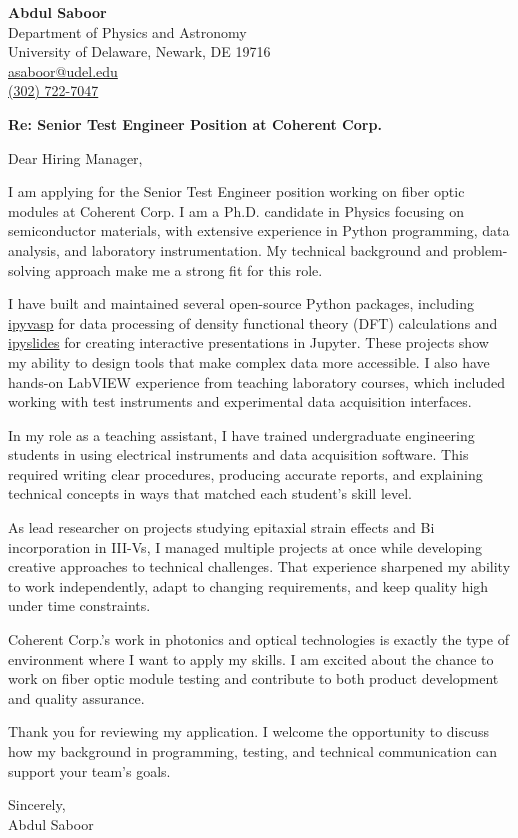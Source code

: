 \documentclass[letter,11pt]{article}
\begin{document}
\noindent
\textbf{Abdul Saboor} \\
Department of Physics and Astronomy \\
University of Delaware, Newark, DE 19716 \\
\href{mailto:asaboor@udel.edu}{asaboor@udel.edu} \\
\href{tel:+13027227047}{(302) 722-7047}

\vspace{5mm}

\noindent
\textbf{Re: Senior Test Engineer Position at Coherent Corp.}
\vspace{5mm}

\noindent
Dear Hiring Manager,

I am applying for the Senior Test Engineer position working on fiber optic modules at Coherent Corp. I am a Ph.D. candidate in Physics focusing on semiconductor materials, with extensive experience in Python programming, data analysis, and laboratory instrumentation. My technical background and problem-solving approach make me a strong fit for this role.

I have built and maintained several open-source Python packages, including \href{https://github.com/asaboor-gh/ipyvasp}{ipyvasp} for data processing of density functional theory (DFT) calculations and \href{https://github.com/asaboor-gh/ipyslides}{ipyslides} for creating interactive presentations in Jupyter. These projects show my ability to design tools that make complex data more accessible. I also have hands-on LabVIEW experience from teaching laboratory courses, which included working with test instruments and experimental data acquisition interfaces.

In my role as a teaching assistant, I have trained undergraduate engineering students in using electrical instruments and data acquisition software. This required writing clear procedures, producing accurate reports, and explaining technical concepts in ways that matched each student’s skill level.

As lead researcher on projects studying epitaxial strain effects and Bi incorporation in III-Vs, I managed multiple projects at once while developing creative approaches to technical challenges. That experience sharpened my ability to work independently, adapt to changing requirements, and keep quality high under time constraints.

Coherent Corp.'s work in photonics and optical technologies is exactly the type of environment where I want to apply my skills. I am excited about the chance to work on fiber optic module testing and contribute to both product development and quality assurance.

Thank you for reviewing my application. I welcome the opportunity to discuss how my background in programming, testing, and technical communication can support your team’s goals.

\vspace{5mm}

\noindent
Sincerely, \\
Abdul Saboor
\end{document}
